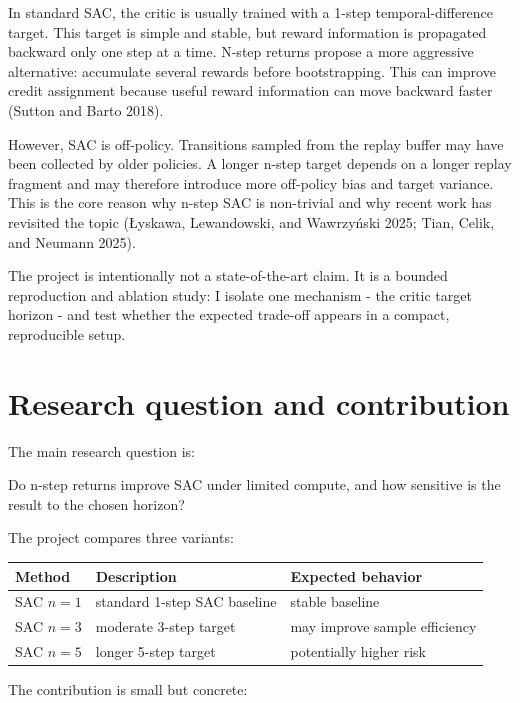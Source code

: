 \documentclass[
  american,
]{article}
\begin{document}
In standard SAC, the critic is usually trained with a 1-step
temporal-difference target. This target is simple and stable, but reward
information is propagated backward only one step at a time. N-step
returns propose a more aggressive alternative: accumulate several
rewards before bootstrapping. This can improve credit assignment because
useful reward information can move backward faster (Sutton and Barto
2018).

However, SAC is off-policy. Transitions sampled from the replay buffer
may have been collected by older policies. A longer n-step target
depends on a longer replay fragment and may therefore introduce more
off-policy bias and target variance. This is the core reason why n-step
SAC is non-trivial and why recent work has revisited the topic (Łyskawa,
Lewandowski, and Wawrzyński 2025; Tian, Celik, and Neumann 2025).

The project is intentionally not a state-of-the-art claim. It is a
bounded reproduction and ablation study: I isolate one mechanism - the
critic target horizon - and test whether the expected trade-off appears
in a compact, reproducible setup.

\section{Research question and
contribution}\label{research-question-and-contribution}

The main research question is:

\begin{keybox}
Do n-step returns improve SAC under limited compute, and how sensitive is the result to the chosen horizon?
\end{keybox}

The project compares three variants:

\begin{longtable}[]{@{}lll@{}}
\toprule\noalign{}
Method & Description & Expected behavior \\
\midrule\noalign{}
\endhead
\bottomrule\noalign{}
\endlastfoot
SAC \(n=1\) & standard 1-step SAC baseline & stable baseline \\
SAC \(n=3\) & moderate 3-step target & may improve sample efficiency \\
SAC \(n=5\) & longer 5-step target & potentially higher risk \\
\end{longtable}

The contribution is small but concrete:
\end{document}
